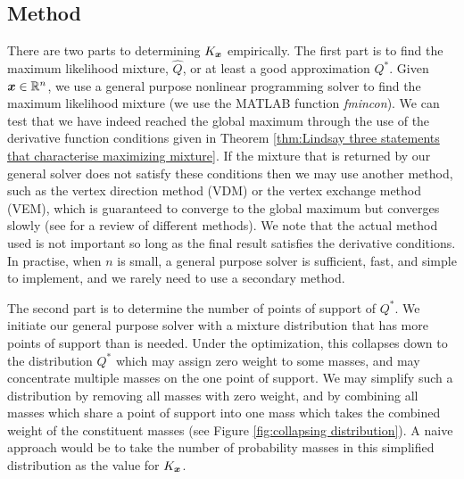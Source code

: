 	\subsection{Method}
	There are two parts to determining $K_{\bm{{x}}}$ empirically. The first part is to find the maximum likelihood mixture, $\hat{Q}$, or at least a good approximation $Q^*$. Given ${\bm{{x}}} \in \mathbb{R}^n$, we use a general purpose nonlinear programming solver to find the maximum likelihood mixture (we use the MATLAB function \emph{fmincon}). We can test that we have indeed reached the global maximum through the use of the derivative function conditions given in Theorem \ref{thm:Lindsay three statements that characterise maximizing mixture}. If the mixture that is returned by our general solver does not satisfy these conditions then we may use another method, such as the vertex direction method (VDM) or the vertex exchange method (VEM), which is guaranteed to converge to the global maximum but converges slowly (see \cite{Bohning1995-di} for a review of different methods). We note that the actual method used is not important so long as the final result satisfies the derivative conditions. In practise, when $n$ is small, a general purpose solver is sufficient, fast, and simple to implement, and we rarely need to use a secondary method.

	The second part is to determine the number of points of support of $Q^*$. We initiate our general purpose solver with a mixture distribution that has more points of support than is needed. Under the optimization, this collapses down to the distribution $Q^*$ which may assign zero weight to some masses, and may concentrate multiple masses on the one point of support. We may simplify such a distribution by removing all masses with zero weight, and by combining all masses which share a point of support into one mass which takes the combined weight of the constituent masses (see Figure \ref{fig:collapsing distribution}). A naive approach would be to take the number of probability masses in this simplified distribution as the value for $K_{\bm{{x}}}$.


